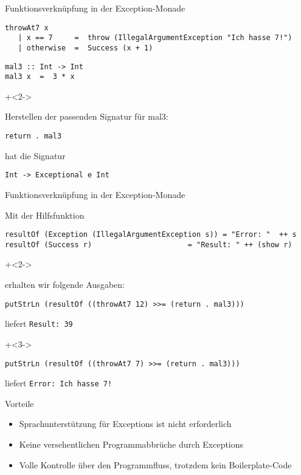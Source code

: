 \begin{frame}[fragile]{Funktionsverknüpfung in der Exception-Monade}
\begin{lstlisting}
throwAt7 x
   | x == 7     =  throw (IllegalArgumentException "Ich hasse 7!")
   | otherwise  =  Success (x + 1)
\end{lstlisting}

\begin{lstlisting}
mal3 :: Int -> Int
mal3 x  =  3 * x
\end{lstlisting}

\onslide+<2->

Herstellen der passenden Signatur für mal3:

\begin{lstlisting}
return . mal3
\end{lstlisting}

hat die Signatur

\begin{lstlisting}
Int -> Exceptional e Int
\end{lstlisting}

\end{frame}


\begin{frame}[fragile]{Funktionsverknüpfung in der Exception-Monade}

Mit der Hilfsfunktion
\begin{lstlisting}
resultOf (Exception (IllegalArgumentException s)) = "Error: "  ++ s
resultOf (Success r)                      = "Result: " ++ (show r)
\end{lstlisting}

\onslide+<2->

erhalten wir folgende Ausgaben:

\begin{lstlisting}
putStrLn (resultOf ((throwAt7 12) >>= (return . mal3)))
\end{lstlisting}
liefert \lstinline|Result: 39|

\onslide+<3->

\begin{lstlisting}
putStrLn (resultOf ((throwAt7 7) >>= (return . mal3)))
\end{lstlisting}
liefert \lstinline|Error: Ich hasse 7!|


\end{frame}

\begin{frame}[fragile]{Vorteile}

\begin{itemize}
\item Sprachunterstützung für Exceptions ist nicht erforderlich
\item Keine versehentlichen Programmabbrüche durch Exceptions
\item Volle Kontrolle über den Programmfluss, trotzdem kein Boilerplate-Code
\end{itemize}

\end{frame}


